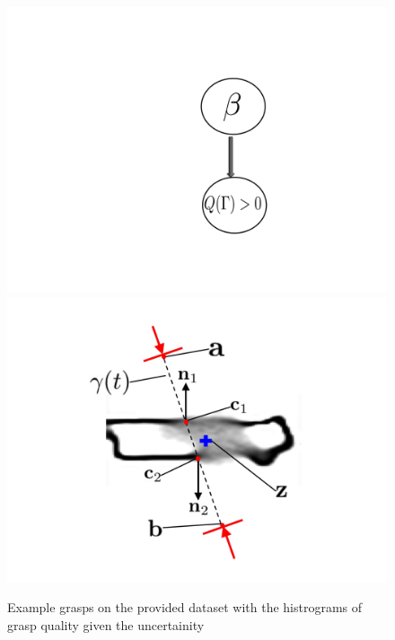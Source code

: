 \documentclass[letterpaper, 10 pt, conference]{ieeeconf}  %
\begin{document}
\begin{figure}[ht!]
\centering
\includegraphics[scale = 0.3]{figures/Slide09.jpg} \includegraphics[scale = 0.3]{figures/Slide10.jpg}
\caption{Example grasps on the provided dataset with the histrograms of grasp quality given the uncertainity}
\vspace*{-10pt}
\label{fig:Grasps}
\end{figure}
\end{document}

